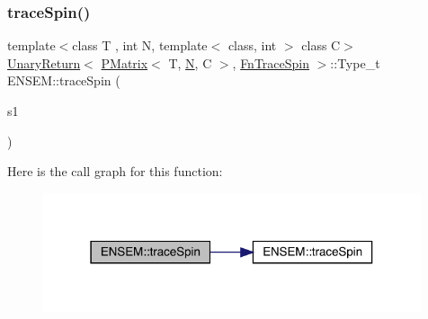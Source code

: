 \subsubsection{\texorpdfstring{traceSpin()}{traceSpin()}}
{\footnotesize\ttfamily template$<$class T , int N, template$<$ class, int $>$ class C$>$ \\
\mbox{\hyperlink{structENSEM_1_1UnaryReturn}{Unary\+Return}}$<$ \mbox{\hyperlink{classENSEM_1_1PMatrix}{P\+Matrix}}$<$ T, \mbox{\hyperlink{operator__name__util_8cc_a7722c8ecbb62d99aee7ce68b1752f337}{N}}, C $>$, \mbox{\hyperlink{structENSEM_1_1FnTraceSpin}{Fn\+Trace\+Spin}} $>$\+::Type\+\_\+t E\+N\+S\+E\+M\+::trace\+Spin (\begin{DoxyParamCaption}\item[{const \mbox{\hyperlink{classENSEM_1_1PMatrix}{P\+Matrix}}$<$ T, \mbox{\hyperlink{operator__name__util_8cc_a7722c8ecbb62d99aee7ce68b1752f337}{N}}, C $>$ \&}]{s1 }\end{DoxyParamCaption})\hspace{0.3cm}{\ttfamily [inline]}}

Here is the call graph for this function\+:\nopagebreak
\begin{figure}[H]
\begin{center}
\leavevmode
\includegraphics[width=315pt]{df/d0a/group__primmatrix_gaaf91f3c1c18cadfc208acd80fd80ab0b_cgraph}
\end{center}
\end{figure}
\mbox{\label{group__primmatrix_gabc920df179ac4bd2438224848ec237af}} 
